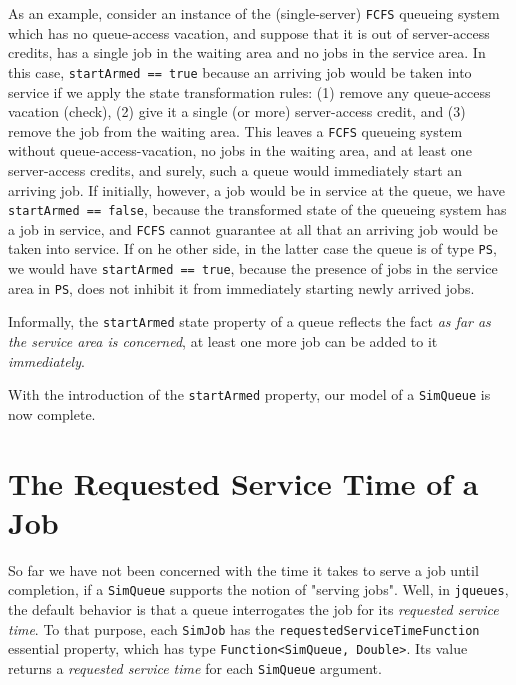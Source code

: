 As an example, consider an instance of the
  (single-server) \lstinline-FCFS- queueing system
  which has no queue-access vacation,
  and suppose that it is out of server-access credits,
  has a single job in the waiting area
  and no jobs in the service area.
In this case, \lstinline-startArmed == true- because
  an arriving job would be taken into service
  if we apply the state transformation rules:
  (1) remove any queue-access vacation (check),
  (2) give it a single (or more) server-access credit,
  and (3) remove the job from the waiting area.
This leaves a \lstinline-FCFS- queueing system without
  queue-access-vacation, no jobs in the waiting area,
  and at least one server-access credits,
  and surely, such a queue would immediately start an arriving job.
If initially, however, a job would be in service at the queue,
  we have \lstinline-startArmed == false-,
  because the transformed state of the queueing system has
  a job in service,
  and \lstinline-FCFS- cannot guarantee at all that
  an arriving job would be taken into service.
If on he other side, in the latter case
  the queue is of type \lstinline-PS-,
  we would have \lstinline-startArmed == true-,
  because the presence of jobs in the service area in \lstinline-PS-,
  does not inhibit it from immediately starting newly arrived jobs.
 
Informally, the \lstinline-startArmed- state property of a queue
  reflects the fact {\em as far as the service area is concerned},
  at least one more job can be added to it {\em immediately}.
  
With the introduction of the \lstinline|startArmed| property,
  our model of a \lstinline|SimQueue| is now complete.

\section{The Requested Service Time of a Job}
\label{sec:requested-service-time}

So far we have not been concerned
  with the time it takes to serve a job until completion,
  if a \lstinline|SimQueue| supports the notion
  of "serving jobs".
Well, in \lstinline|jqueues|,
  the default behavior is that
  a queue interrogates the job for its
  {\em requested service time}.
To that purpose,
  each \lstinline|SimJob| has the
  \lstinline|requestedServiceTimeFunction|
  essential property,
  which has type \lstinline|Function<SimQueue, Double>|.
Its value returns a {\em requested service time\/}
  for each \lstinline|SimQueue| argument.

